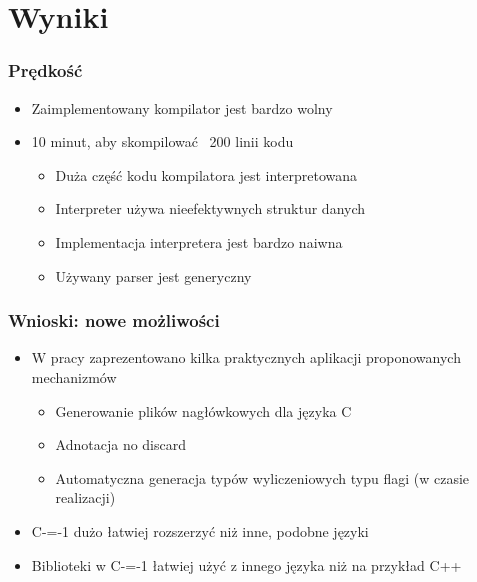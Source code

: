 \section{Wyniki}

\begin{frame}
	\frametitle{Prędkość}

	\begin{itemize}
		\item Zaimplementowany kompilator jest bardzo wolny
		\item 10 minut, aby skompilować ~200 linii kodu\begin{itemize}
			\item Duża część kodu kompilatora jest interpretowana
			\item Interpreter używa nieefektywnych struktur danych
			\item Implementacja interpretera jest bardzo naiwna
			\item Używany parser jest generyczny
		\end{itemize}
	\end{itemize}

\end{frame}

\begin{frame}
	\frametitle{Wnioski: nowe możliwości}

	\begin{itemize}
		\item W pracy zaprezentowano kilka praktycznych aplikacji proponowanych mechanizmów\begin{itemize}
			\item Generowanie plików nagłówkowych dla języka C
			\item Adnotacja no discard
			\item Automatyczna generacja typów wyliczeniowych typu flagi (w czasie realizacji)
		\end{itemize}
		\item C-=-1 dużo łatwiej rozszerzyć niż inne, podobne języki
		\item Biblioteki w C-=-1 łatwiej użyć z innego języka niż na przykład C++
	\end{itemize}

\end{frame}

